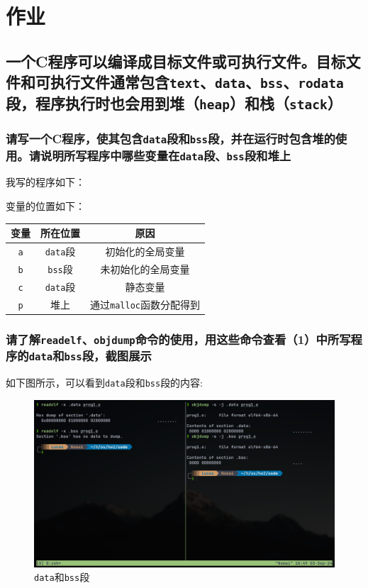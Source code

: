 \section{作业}

\subsection{
    一个C程序可以编译成目标文件或可执行文件。目标文件和可执行文件通常包含{\tt text}、{\tt data}、{\tt bss}、{\tt rodata}段，程序执行时也会用到堆（{\tt heap}）和栈（{\tt stack}）
}

\subsubsection{
    请写一个C程序，使其包含{\tt data}段和{\tt bss}段，并在运行时包含堆的使用。请说明所写程序中哪些变量在{\tt data}段、{\tt bss}段和堆上
}

\noindent
我写的程序如下：



\noindent
变量的位置如下：

\begin{tabular}{|c|c|c|}
    \hline
    变量 & 所在位置 & 原因 \\
    \hline
    {\tt a} & {\tt data}段 & 初始化的全局变量 \\
    \hline
    {\tt b} & {\tt bss}段 & 未初始化的全局变量 \\
    \hline
    {\tt c} & {\tt data}段 & 静态变量 \\
    \hline
    {\tt *p} & 堆上 & 通过{\tt malloc}函数分配得到 \\
    \hline
\end{tabular}

\subsubsection{
    请了解{\tt readelf}、{\tt objdump}命令的使用，用这些命令查看（1）中所写程序的{\tt data}和{\tt bss}段，截图展示
}

\noindent
如下图所示，可以看到{\tt data}段和{\tt bss}段的内容:

\begin{figure}[H]
    \centering
    \includegraphics[width=1\textwidth]{fig/data_bss.png}
    \caption{{\tt data}和{\tt bss}段}
\end{figure}

